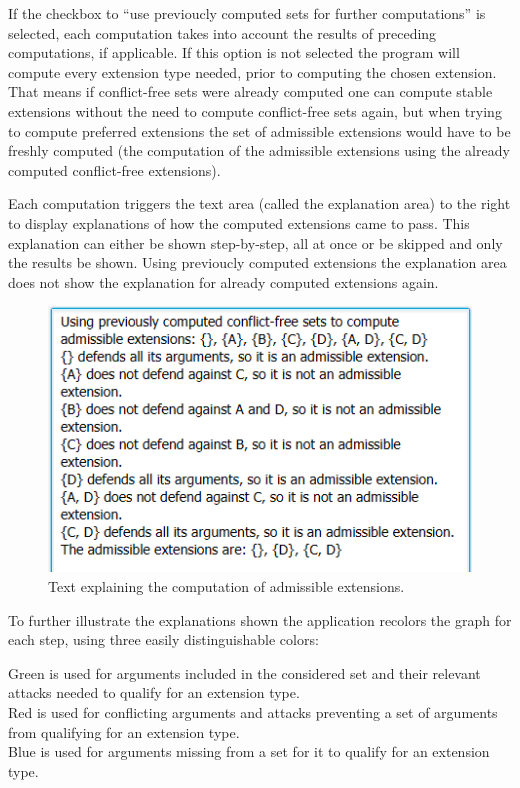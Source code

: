 \documentclass[draft,final]{vutinfth} %
\newcommand{\hl}{\par\vspace{6pt}} %
\begin{document}
If the checkbox to ``use previoucly computed sets for further computations'' is selected, each computation takes into account the results of preceding computations, if applicable. If this option is not selected the program will compute every extension type needed, prior to computing the chosen extension.\\
That means if conflict-free sets were already computed one can compute stable extensions without the need to compute conflict-free sets again, but when trying to compute preferred extensions the set of admissible extensions would have to be freshly computed (the computation of the admissible extensions using the already computed conflict-free extensions).\hl
Each computation triggers the text area (called the explanation area) to the right to display explanations of how the computed extensions came to pass. This explanation can either be shown step-by-step, all at once or be skipped and only the results be shown. Using previoucly computed extensions the explanation area does not show the explanation for already computed extensions again.

\FloatBarrier
	\begin{figure}[!h]
		\centering
		\includegraphics{pics/explanation.png}
		\caption{Text explaining the computation of admissible extensions.}
	\end{figure}
\FloatBarrier

To further illustrate the explanations shown the application recolors the graph for each step, using three easily distinguishable colors:\hl
Green is used for arguments included in the considered set and their relevant attacks needed to qualify for an extension type.\\
Red is used for conflicting arguments and attacks preventing a set of arguments from qualifying for an extension type.\\
Blue is used for arguments missing from a set for it to qualify for an extension type.\hl
\end{document}
